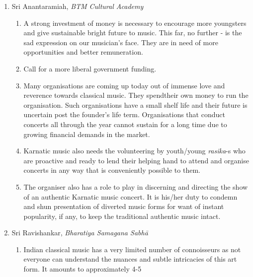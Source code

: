 \begin{enumerate}
\itemsep=0pt

 \item Sri Anantaramiah, \textit{BTM Cultural Academy}
 
\begin{enumerate}
\itemsep=0pt

 \item A strong investment of money is necessary to encourage more youngsters and give sustainable bright future to music. This far, no further - is the sad expression on our musician’s face. They are in need of more opportunities and better remuneration.

 \item Call for a more liberal government funding.

 \item Many organisations are coming up today out of immense love and reverence towards classical music. They spend\break their own money to run the organisation. Such organisations have a small shelf life and their future is uncertain post the founder’s life term. Organisations that conduct concerts all through the year cannot sustain for a long time due to growing financial demands in the market.

 \item Karnatic music also needs the volunteering by youth/young \textit{rasika}-s who are proactive and ready to lend their helping hand to attend and organise concerts in any way that is conveniently possible to them.

 \item The organiser also has a role to play in discerning and directing the show of an authentic Karnatic music concert. It is his/her duty to condemn and shun presentation of diverted music forms for want of instant popularity, if any, to keep the traditional authentic music intact.
\end{enumerate}


 \item Sri Ravishankar, \textit{Bharatiya Samagana Sabhā}
 
\begin{enumerate}
\itemsep=0pt

 \item Indian classical music has a very limited number of connoisseurs as not everyone can understand the nuances and subtle intricacies of this art form. It amounts to approximately 4-5\\%


\end{enumerate}
\end{enumerate}
